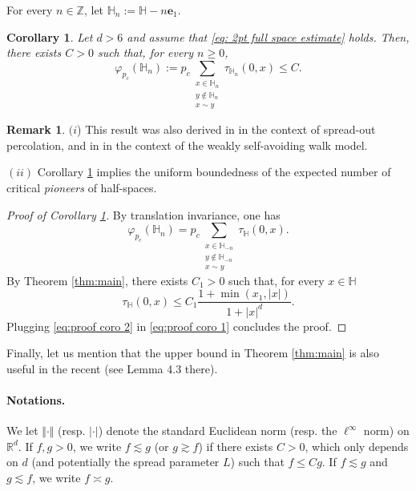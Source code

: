 \documentclass[11pt,a4paper]{article}
\numberwithin{equation}{section}
\theoremstyle{plain}
\newtheorem{Coro}[Thm]{Corollary}
\theoremstyle{definition}
\newtheorem{Rem}[Thm]{Remark}
\begin{document}
For every $n\in \mathbb Z$, let $\mathbb H_n:=\mathbb H-n\mathbf{e}_1$. 
\begin{Coro}\label{coro: pionneers} Let $d>6$ and assume that \eqref{eq: 2pt full space estimate} holds. Then, there exists $C>0$ such that, for every $n\geq 0$,
\begin{equation}
	\varphi_{p_c}(\mathbb H_n):=p_c\sum_{\substack{x\in \mathbb H_n\\y\notin \mathbb H_n\\x\sim y}}\tau_{\mathbb H_n}(0,x)\leq C.
\end{equation}
\end{Coro}
\begin{Rem} $(i$) This result was also derived in \cite{DumPan24Perco} in the context of spread-out percolation, and in \cite{DumPan24WSAW} in the context of the weakly self-avoiding walk model.

$(ii)$ Corollary \ref{coro: pionneers} implies the uniform boundedness of the expected number of critical \emph{pioneers} of half-spaces.
\end{Rem}
\begin{proof}[Proof of Corollary \textup{\ref{coro: pionneers}}] By translation invariance, one has
\begin{equation}\label{eq:proof coro 1}
	\varphi_{p_c}(\mathbb H_n)=p_c\sum_{\substack{x\in  \mathbb H_{-n}\\y\notin \mathbb H_{-n}\\x\sim y }}\tau_{\mathbb H}(0,x).
\end{equation}
By Theorem \ref{thm:main}, there exists $C_1>0$ such that, for every $x\in \mathbb H$
\begin{equation}\label{eq:proof coro 2}
	\tau_{\mathbb H}(0,x)\leq C_1\frac{1+\min(x_1,|x|)}{1+|x|^d}.
\end{equation}
Plugging \eqref{eq:proof coro 2} in \eqref{eq:proof coro 1} concludes the proof.
\end{proof}
Finally, let us mention that the upper bound in Theorem \ref{thm:main} is also useful in the recent \cite{Asselah2025capacity} (see Lemma 4.3 there).


\paragraph{Notations.} We let $\Vert \cdot \Vert$ (resp. $|\cdot |$) denote the standard Euclidean norm (resp. the $\ell^\infty$ norm) on $\mathbb R^d$. If $f,g>0$, we write $f\lesssim g$ (or $g\gtrsim f$) if there exists $C>0$, which only depends on $d$ (and potentially the spread parameter $L$) such that $f\leq Cg$. If $f\lesssim g$ and $g\lesssim f$, we write $f\asymp g$.
\end{document}
